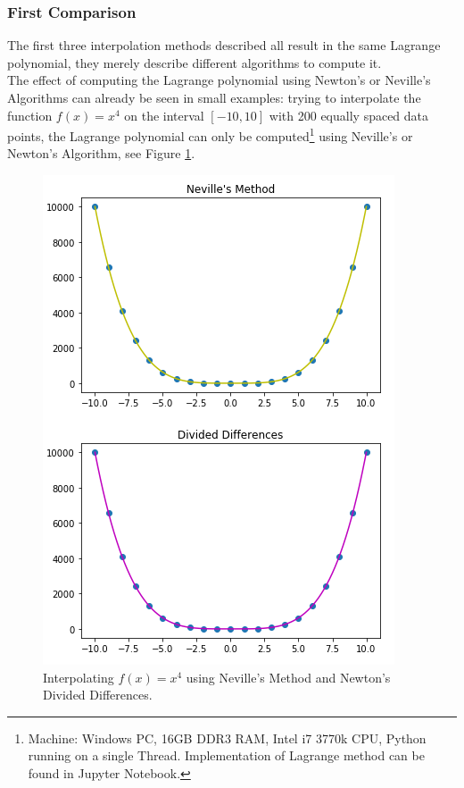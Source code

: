 \documentclass[a4paper,11pt, notitlepage]{article}
\begin{document}
\begin{onehalfspace}
\subsubsection{First Comparison}
\label{subsubsec:fstcmp}
The first three interpolation methods described all result in the same Lagrange polynomial, they merely describe different algorithms to compute it. \\
The effect of computing the Lagrange polynomial using Newton's or Neville's Algorithms can already be seen in small examples: trying to interpolate the function $f(x)=x^4$ on the interval $[-10, 10]$ with 200 equally spaced data points, the Lagrange polynomial can only be computed\footnote{Machine: Windows PC, 16GB DDR3 RAM, Intel i7 3770k CPU, Python running on a single Thread. Implementation of Lagrange method can be found in Jupyter Notebook.} using Neville's or Newton's Algorithm, see Figure \ref{fig:nev-new-x4}.

 \begin{figure}
 	\centering
 	\includegraphics[width=\textwidth]{./images/nevnewx4.png}
 	\caption{Interpolating $f(x)=x^4$ using Neville's Method and Newton's Divided Differences.}
 	\label{fig:nev-new-x4}
 \end{figure}


\end{onehalfspace}
\end{document}
